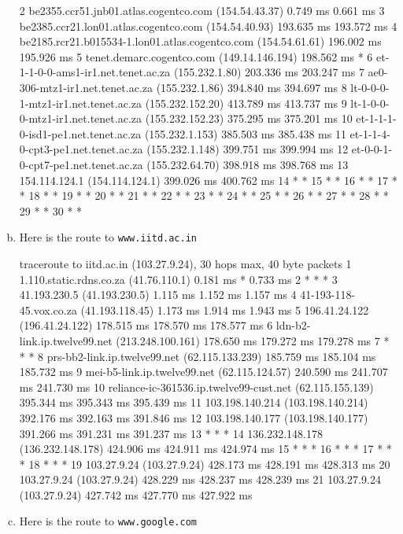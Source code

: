 \documentclass{article}
\begin{document}
\begin{enumerate}[a.]
\begin{code}
 2  be2355.ccr51.jnb01.atlas.cogentco.com (154.54.43.37)  0.749 ms  0.661 ms
 3  be2385.ccr21.lon01.atlas.cogentco.com (154.54.40.93)  193.635 ms  193.572 ms
 4  be2185.rcr21.b015534-1.lon01.atlas.cogentco.com (154.54.61.61)  196.002 ms  195.926 ms
 5  tenet.demarc.cogentco.com (149.14.146.194)  198.562 ms *
 6  et-1-1-0-0-ams1-ir1.net.tenet.ac.za (155.232.1.80)  203.336 ms  203.247 ms
 7  ae0-306-mtz1-ir1.net.tenet.ac.za (155.232.1.86)  394.840 ms  394.697 ms
 8  lt-0-0-0-1-mtz1-ir1.net.tenet.ac.za (155.232.152.20)  413.789 ms  413.737 ms
 9  lt-1-0-0-0-mtz1-ir1.net.tenet.ac.za (155.232.152.23)  375.295 ms  375.201 ms
10  et-1-1-1-0-isd1-pe1.net.tenet.ac.za (155.232.1.153)  385.503 ms  385.438 ms
11  et-1-1-4-0-cpt3-pe1.net.tenet.ac.za (155.232.1.148)  399.751 ms  399.994 ms
12  et-0-0-1-0-cpt7-pe1.net.tenet.ac.za (155.232.64.70)  398.918 ms  398.768 ms
13  154.114.124.1 (154.114.124.1)  399.026 ms  400.762 ms
14  * *
15  * *
16  * *
17  * *
18  * *
19  * *
20  * *
21  * *
22  * *
23  * *
24  * *
25  * *
26  * *
27  * *
28  * *
29  * *
30  * *
\end{code}
\item Here is the route to {\tt www.iitd.ac.in}
\begin{code}
 traceroute to iitd.ac.in (103.27.9.24), 30 hops max, 40 byte packets
 1  1.110.static.rdns.co.za (41.76.110.1)  0.181 ms *  0.733 ms
 2  * * *
 3  41.193.230.5 (41.193.230.5)  1.115 ms  1.152 ms  1.157 ms
 4  41-193-118-45.vox.co.za (41.193.118.45)  1.173 ms  1.914 ms  1.943 ms
 5  196.41.24.122 (196.41.24.122)  178.515 ms  178.570 ms  178.577 ms
 6  ldn-b2-link.ip.twelve99.net (213.248.100.161)  178.650 ms  179.272 ms  179.278 ms
 7  * * *
 8  prs-bb2-link.ip.twelve99.net (62.115.133.239)  185.759 ms  185.104 ms  185.732 ms
 9  mei-b5-link.ip.twelve99.net (62.115.124.57)  240.590 ms  241.707 ms  241.730 ms
10  reliance-ic-361536.ip.twelve99-cust.net (62.115.155.139)  395.344 ms  395.343 ms  395.439 ms
11  103.198.140.214 (103.198.140.214)  392.176 ms  392.163 ms  391.846 ms
12  103.198.140.177 (103.198.140.177)  391.266 ms  391.231 ms  391.237 ms
13  * * *
14  136.232.148.178 (136.232.148.178)  424.906 ms  424.911 ms  424.974 ms
15  * * *
16  * * *
17  * * *
18  * * *
19  103.27.9.24 (103.27.9.24)  428.173 ms  428.191 ms  428.313 ms
20  103.27.9.24 (103.27.9.24)  428.229 ms  428.237 ms  428.239 ms
21  103.27.9.24 (103.27.9.24)  427.742 ms  427.770 ms  427.922 ms
\end{code}
\item Here is the route to {\tt www.google.com}
\begin{code}

\end{code}
\end{enumerate}
\end{document}
